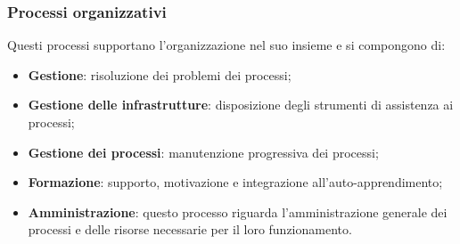 \subsubsection{Processi organizzativi}
Questi processi supportano l'organizzazione nel suo insieme e si compongono di:
\begin{itemize}
    \item \textbf{Gestione}: risoluzione dei problemi dei processi;
    \item \textbf{Gestione delle infrastrutture}: disposizione degli strumenti di assistenza ai processi;
    \item \textbf{Gestione dei processi}: manutenzione progressiva dei processi;
    \item \textbf{Formazione}: supporto, motivazione e integrazione all’auto-apprendimento;
    \item \textbf{Amministrazione}: questo processo riguarda l'amministrazione generale dei processi e delle risorse necessarie per il loro funzionamento.
\end{itemize}